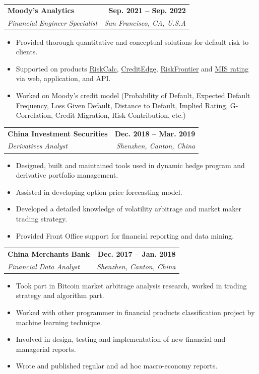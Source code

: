 \documentclass[letterpaper,11pt]{article}
\makeatletter
\newcommand{\resumeItem}[1]{
  \item\small{
    {#1 \vspace{-2pt}}
  }
}
\newcommand{\resumeSubheading}[4]{
  \vspace{-2pt}\item
    \begin{tabular*}{1.0\textwidth}[t]{l@{\extracolsep{\fill}}r}
      \textbf{#1} & \textbf{\small #2} \\
      \textit{\small#3} & \textit{\small #4} \\
    \end{tabular*}\vspace{-7pt}
}
\newcommand{\resumeItemListStart}{\begin{itemize}[itemsep=0pt]}
\newcommand{\resumeItemListEnd}{\end{itemize}\vspace{-5pt}}
\makeatother
\begin{document}
    \resumeSubheading
      {Moody’s Analytics}{Sep. 2021 -- Sep. 2022}
      {Financial Engineer Specialist}{San Francisco, CA, U.S.A}
      \resumeItemListStart
        \resumeItem{Provided thorough quantitative and conceptual solutions for default risk to clients.}
        \resumeItem{Supported on products \textcolor{blue}{\href{https://www.moodysanalytics.com/product-list/riskcalc}{RiskCalc}}, \textcolor{blue}{\href{https://www.creditedge.com}{CreditEdge}}, \textcolor{blue}{\href{https://www.moodysanalytics.com/product-list/riskfrontier}{RiskFrontier}} and \textcolor{blue}{\href{https://ratings.moodys.io}{MIS rating}} via web, application, and API.}
        \resumeItem{Worked on Moody’s credit model (Probability of Default, Expected Default Frequency, Loss Given
Default, Distance to Default, Implied Rating, G-Correlation, Credit Migration, Risk Contribution, etc.)}

      \resumeItemListEnd

    \resumeSubheading
      {China Investment Securities}{Dec. 2018 -- Mar. 2019}
      {Derivatives Analyst}{Shenzhen, Canton, China}
      \resumeItemListStart
        \resumeItem{Designed, built and maintained tools used in dynamic hedge program and derivative portfolio management.}
        \resumeItem{Assisted in developing option price forecasting model.}
        \resumeItem{Developed a detailed knowledge of volatility arbitrage and market maker trading strategy.}
        \resumeItem{Provided Front Office support for financial reporting and data mining.}
    \resumeItemListEnd

    \resumeSubheading
      {China Merchants Bank}{Dec. 2017 -- Jan. 2018}
      {Financial Data Analyst}{Shenzhen, Canton, China}
      \resumeItemListStart
        \resumeItem{Took part in Bitcoin market arbitrage analysis research, worked in trading strategy and algorithm part.}
        \resumeItem{Worked with other programmer in financial products classification project by machine learning technique.}
        \resumeItem{Involved in design, testing and implementation of new financial and managerial reports.}
        \resumeItem{Wrote and published regular and ad hoc macro-economy reports.}
    \resumeItemListEnd

    
\end{document}
